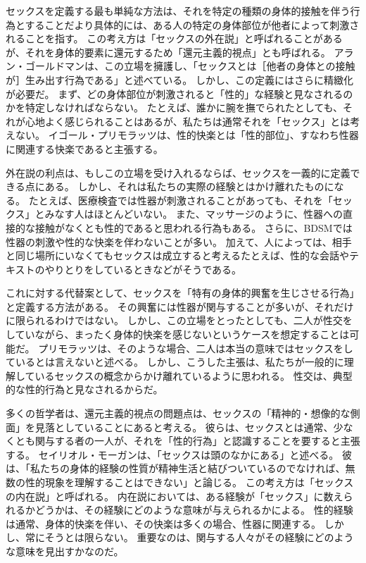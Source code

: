 \documentclass[paper=a4,book,openany]{jlreq} \usepackage{mystyle}
\begin{document}
セックスを定義する最も単純な方法は、それを特定の種類の身体的接触を伴う行為とすることだ{\DDASH}より具体的には、ある人の特定の身体部位が他者によって刺激されることを指す。
この考え方は「セックスの外在説」と呼ばれることがあるが、それを身体的要素に還元するため「還元主義的視点」とも呼ばれる。
アラン・ゴールドマンは、この立場を擁護し、「セックスとは［他者の身体との接触が］生み出す行為である」と述べている\citep[p.268]{goldman77:_plain_sex}。
しかし、この定義にはさらに精緻化が必要だ。
まず、どの身体部位が刺激されると「性的」な経験と見なされるのかを特定しなければならない。
たとえば、誰かに腕を撫でられたとしても、それが心地よく感じられることはあるが、私たちは通常それを「セックス」とは考えない。
イゴール・プリモラッツは、性的快楽とは「性的部位」、すなわち性器に関連する快楽であると主張する\citep[p.46]{primoratz99:_ethic_and_sex}。

外在説の利点は、もしこの立場を受け入れるならば、セックスを一義的に定義できる点にある。
しかし、それは私たちの実際の経験とはかけ離れたものになる。
たとえば、医療検査では性器が刺激されることがあっても、それを「セックス」とみなす人はほとんどいない。
また、マッサージのように、性器への直接的な接触がなくとも性的であると思われる行為もある。
さらに、BDSMでは性器の刺激や性的な快楽を伴わないことが多い。
加えて、人によっては、相手と同じ場所にいなくてもセックスは成立すると考える{\DDASH}たとえば、性的な会話やテキストのやりとりをしているときなどがそうである\citep[pp. 19--20]{soble06:_activ_sexual}。

これに対する代替案として、セックスを「特有の身体的興奮を生じさせる行為」と定義する方法がある。
その興奮には性器が関与することが多いが、それだけに限られるわけではない\citep{janssen02:_sexual_inhib_sis1,janssen02:_sexual_inhib_sis2}。
しかし、この立場をとったとしても、二人が性交をしていながら、まったく身体的快楽を感じないというケースを想定することは可能だ。
プリモラッツは、そのような場合、二人は本当の意味ではセックスをしているとは言えないと述べる\citep[pp. 47--49]{primoratz99:_ethic_and_sex}。
しかし、こうした主張は、私たちが一般的に理解しているセックスの概念からかけ離れているように思われる。
性交は、典型的な性的行為と見なされるからだ。

多くの哲学者は、還元主義的視点の問題点は、セックスの「精神的・想像的な側面」を見落としていることにあると考える。
彼らは、セックスとは通常、少なくとも関与する者の一人が、それを「性的行為」と認識することを要すると主張する。
セイリオル・モーガンは、「セックスは頭のなかにある」と述べる。
彼は、「私たちの身体的経験の性質が精神生活と結びついているのでなければ、無数の性的現象を理解することはできない」と論じる\citep[p.5]{morgan03:_sex_in_head}。
この考え方は「セックスの内在説」と呼ばれる。
内在説においては、ある経験が「セックス」に数えられるかどうかは、その経験にどのような意味が与えられるかによる。
性的経験は通常、身体的快楽を伴い、その快楽は多くの場合、性器に関連する。
しかし、常にそうとは限らない。
重要なのは、関与する人々がその経験にどのような意味を見出すかなのだ。
\end{document}

